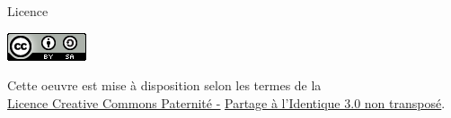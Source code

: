 \documentclass{beamer}
\begin{document}
\begin{frame}{Licence}
\begin{center}
 \includegraphics{./88x31.png}
\end{center}
\vspace{20px}
Cette oeuvre est mise à disposition selon les termes de la\\
\underline{\href{http://creativecommons.org/licenses/by-sa/3.0/}{Licence Creative Commons Paternité -}}
\underline{\href{http://creativecommons.org/licenses/by-sa/3.0/}{Partage à l'Identique 3.0 non transposé}}.

\end{frame}
\end{document}
